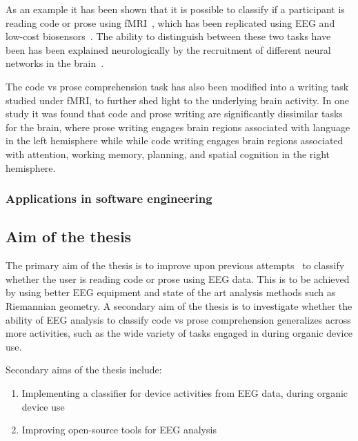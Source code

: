 \documentclass[a4paper]{article}
\begin{document}
\begin{refsection}
         As an example it has been shown that it is possible to classify if a participant is reading code or prose using fMRI~\cite{floyd_decoding_2017}, which has been replicated using EEG and low-cost biosensors~\cite{fucci_replication_2019}. The ability to distinguish between these two tasks have been has been explained neurologically by the recruitment of different neural networks in the brain~\cite{ivanova_comprehension_2020}. 

        The code vs prose comprehension task has also been modified into a writing task studied under fMRI, to further shed light to the underlying brain activity. In one study it was found that code and prose writing are significantly dissimilar tasks for the brain, where prose writing engages brain regions associated with language in the left hemisphere while while code writing engages brain regions associated with attention, working memory, planning, and spatial cognition in the right hemisphere\cite{noauthor_neurological_nodate}.

    \subsubsection{Applications in software engineering}




\subsection{Aim of the thesis}

    The primary aim of the thesis is to improve upon previous attempts~\cite{fucci_replication_2019} to classify whether the user is reading code or prose using EEG data. This is to be achieved by using better EEG equipment and state of the art analysis methods such as Riemannian geometry. A secondary aim of the thesis is to investigate whether the ability of EEG analysis to classify code vs prose comprehension generalizes across more activities, such as the wide variety of tasks engaged in during organic device use.

    Secondary aims of the thesis include:

    \begin{enumerate}
        \item Implementing a classifier for device activities from EEG data, during organic device use
        \item Improving open-source tools for EEG analysis
    \end{enumerate}


\end{refsection}
\end{document}

